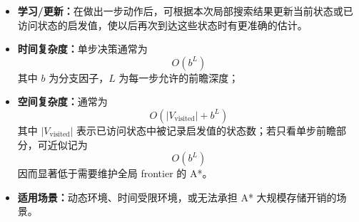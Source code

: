 \documentclass[../main.tex]{subfiles}
\begin{document}
\begin{enumerate}
\begin{itemize}
        \item \textbf{学习/更新：}在做出一步动作后，可根据本次局部搜索结果更新当前状态或已访问状态的启发值，使以后再次到达这些状态时有更准确的估计。
        
        \item \textbf{时间复杂度：}单步决策通常为
        $$
        O(b^L)
        $$
        其中 $b$ 为分支因子，$L$ 为每一步允许的前瞻深度；

        \item \textbf{空间复杂度：}通常为
        $$
        O\!\left(|V_{\mathrm{visited}}|+b^L\right)
        $$
        其中 $|V_{\mathrm{visited}}|$ 表示已访问状态中被记录启发值的状态数；若只看单步前瞻部分，可近似记为
        $$
        O(b^L)
        $$
        因而显著低于需要维护全局 frontier 的 A*。
        
        \item \textbf{适用场景：}动态环境、时间受限环境，或无法承担 A* 大规模存储开销的场景。
        

\end{itemize}
\end{enumerate}
\end{document}
